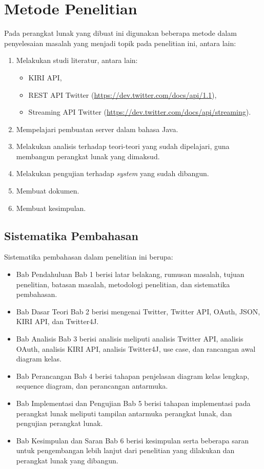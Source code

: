 \section{Metode Penelitian}
Pada perangkat lunak yang dibuat ini digunakan beberapa metode dalam penyelesaian masalah yang menjadi topik pada penelitian ini, antara lain:
\begin{enumerate}
	\item Melakukan studi literatur, antara lain:
	\begin{itemize}
		\item KIRI API,
		\item REST API Twitter (\url{https://dev.twitter.com/docs/api/1.1}),
		\item Streaming API Twitter (\url{https://dev.twitter.com/docs/api/streaming}).
	\end{itemize}
	\item Mempelajari pembuatan server dalam bahasa Java.
	\item Melakukan analisis terhadap teori-teori yang sudah dipelajari, guna membangun perangkat lunak yang dimaksud.
	\item Melakukan pengujian terhadap \textit{system} yang sudah dibangun.
	\item Membuat dokumen.
	\item Membuat kesimpulan.
\end{enumerate}

\subsection{Sistematika Pembahasan}

Sistematika pembahasan dalam penelitian ini berupa:
\begin{itemize}
	\item Bab Pendahuluan
	Bab 1 berisi latar belakang, rumusan masalah, tujuan penelitian, batasan masalah, metodologi penelitian, dan sistematika pembahasan.
	\item Bab Dasar Teori
	Bab 2 berisi mengenai Twitter, Twitter API, OAuth, JSON, KIRI API, dan Twitter4J.
	\item Bab Analisis
	Bab 3 berisi analisis meliputi analisis Twitter API, analisis OAuth, analisis KIRI API, analisis Twitter4J, use case, dan rancangan awal diagram kelas.
	\item Bab Perancangan
	Bab 4 berisi tahapan penjelasan diagram kelas lengkap, sequence diagram, dan perancangan antarmuka.
	\item Bab Implementasi dan Pengujian
	Bab 5 berisi tahapan implementasi pada perangkat lunak meliputi tampilan antarmuka perangkat lunak, dan pengujian perangkat lunak.
	\item Bab Kesimpulan dan Saran
	Bab 6 berisi kesimpulan serta beberapa saran untuk pengembangan lebih lanjut dari penelitian yang dilakukan dan perangkat lunak yang dibangun.
\end{itemize}